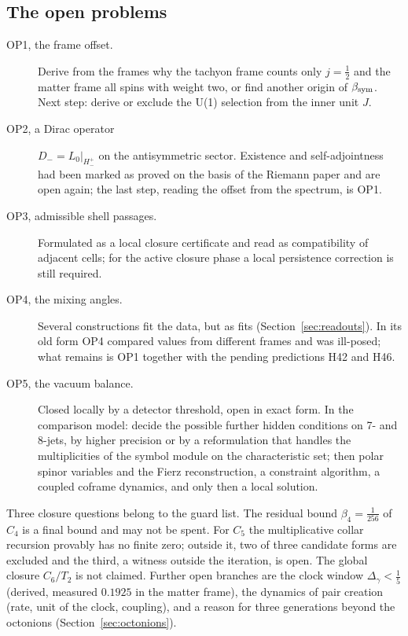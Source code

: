 \subsection{The open problems}

\begin{description}
\item[OP1, the frame offset.]  Derive from the frames why the tachyon frame counts only \(j=\tfrac12\) and the matter frame all spins with weight
two, or find another origin of \(\beta_{\rm sym}\).  Next step: derive or exclude the U(1) selection from the inner unit \(J\).
\item[OP2, a Dirac operator] \(D_-=L_0|_{H^+_-}\) on the antisymmetric sector.  Existence and self-adjointness had been marked as proved on
the basis of the Riemann paper and are open again; the last step, reading the offset from the spectrum, is OP1.
\item[OP3, admissible shell passages.]  Formulated as a local closure certificate and read as compatibility of adjacent cells; for the active
closure phase a local persistence correction is still required.
\item[OP4, the mixing angles.]  Several constructions fit the data, but as fits (Section~\ref{sec:readouts}).  In its old form OP4 compared
values from different frames and was ill-posed; what remains is OP1 together with the pending predictions H42 and H46.
\item[OP5, the vacuum balance.]  Closed locally by a detector threshold, open in exact form.  In the comparison model: decide the possible
further hidden conditions on 7- and 8-jets, by higher precision or by a reformulation that handles the multiplicities of the symbol module
on the characteristic set; then polar spinor variables and the Fierz reconstruction, a constraint algorithm, a coupled coframe dynamics, and
only then a local solution.
\end{description}

Three closure questions belong to the guard list.  The residual bound \(\beta_4=\tfrac1{256}\) of \(C_4\) is a final bound and may not be spent.
For \(C_5\) the multiplicative collar recursion provably has no finite zero; outside it, two of three candidate forms are excluded and the third,
a witness outside the iteration, is open.  The global closure \(C_6/T_2\) is not claimed.  Further open branches are the clock window
\(\Delta_\gamma<\tfrac15\) (derived, measured \(0.1925\) in the matter frame), the dynamics of pair creation (rate, unit of the clock, coupling),
and a reason for three generations beyond the octonions (Section~\ref{sec:octonions}).


